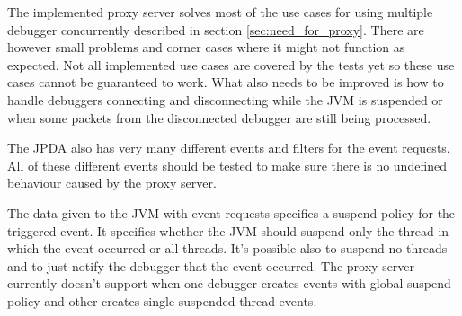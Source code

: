 \documentclass[..thesis.tex]{subfiles}
\begin{document}
The implemented proxy server solves most of the use cases for using multiple debugger concurrently described in section \ref{sec:need_for_proxy}.
There are however small problems and corner cases where it might not function as expected.
Not all implemented use cases are covered by the tests yet so these use cases cannot be guaranteed to work.
What also needs to be improved is how to handle debuggers connecting and disconnecting while the JVM is suspended or when some packets from the disconnected debugger are still being processed.

The JPDA also has very many different events and filters for the event requests.
All of these different events should be tested to make sure there is no undefined behaviour caused by the proxy server.

The data given to the JVM with event requests specifies a suspend policy for the triggered event.
It specifies whether the JVM should suspend only the thread in which the event occurred or all threads.
It's possible also to suspend no threads and to just notify the debugger that the event occurred.
The proxy server currently doesn't support when one debugger creates events with global suspend policy and other creates single suspended thread events.
\end{document}
